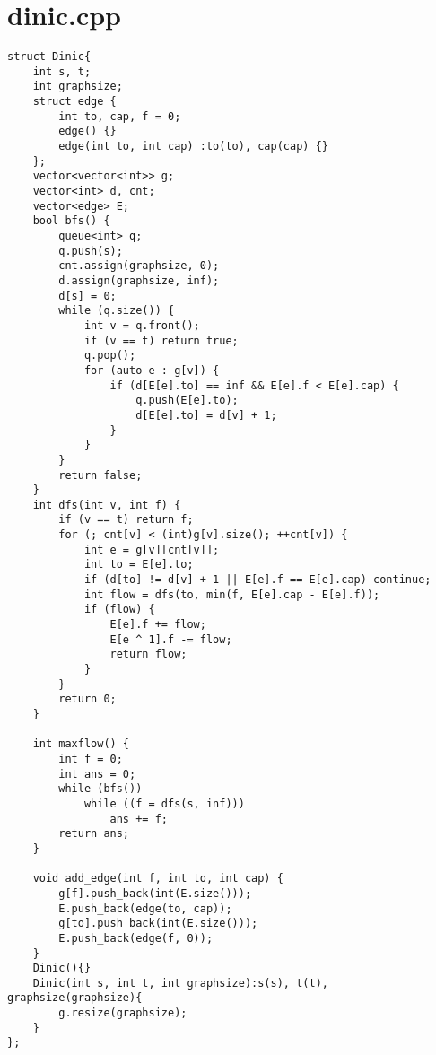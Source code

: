\documentclass[a4paper,12pt]{report}
\begin{document}
\section{dinic.cpp}
\begin{lstlisting}
struct Dinic{
    int s, t;
    int graphsize;
    struct edge { 
        int to, cap, f = 0; 
        edge() {}
        edge(int to, int cap) :to(to), cap(cap) {}
    };
    vector<vector<int>> g;
    vector<int> d, cnt;
    vector<edge> E;
    bool bfs() {
        queue<int> q;
        q.push(s);
        cnt.assign(graphsize, 0);
        d.assign(graphsize, inf);
        d[s] = 0;
        while (q.size()) {
            int v = q.front();
            if (v == t) return true;
            q.pop();
            for (auto e : g[v]) {
                if (d[E[e].to] == inf && E[e].f < E[e].cap) {
                    q.push(E[e].to);
                    d[E[e].to] = d[v] + 1;
                }
            }
        }
        return false;
    }
    int dfs(int v, int f) {
        if (v == t) return f;
        for (; cnt[v] < (int)g[v].size(); ++cnt[v]) {
            int e = g[v][cnt[v]];
            int to = E[e].to;
            if (d[to] != d[v] + 1 || E[e].f == E[e].cap) continue;
            int flow = dfs(to, min(f, E[e].cap - E[e].f));
            if (flow) {
                E[e].f += flow;
                E[e ^ 1].f -= flow;
                return flow;
            }
        }
        return 0;
    }
    
    int maxflow() {
        int f = 0;
        int ans = 0;
        while (bfs())
            while ((f = dfs(s, inf)))
                ans += f;
        return ans;
    }
    
    void add_edge(int f, int to, int cap) {
        g[f].push_back(int(E.size()));
        E.push_back(edge(to, cap));
        g[to].push_back(int(E.size()));
        E.push_back(edge(f, 0));
    }
    Dinic(){}
    Dinic(int s, int t, int graphsize):s(s), t(t), graphsize(graphsize){
        g.resize(graphsize);
    }
};

\end{lstlisting}
\end{document}
